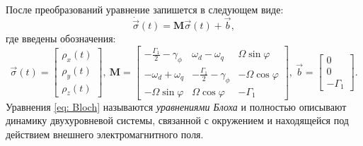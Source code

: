 После преобразований уравнение запишется в следующем виде:
\begin{equation}
\label{eq: Bloch}
\dot{\vec{\sigma}}{\left(t\right)} = \mathbf{M}\vec{\sigma}{\left(t\right)} + \vec{b}, 
\end{equation}
где введены обозначения:
\begin{equation}
\vec{\sigma}(t) = \left[\begin{matrix}\rho_x(t)\\\rho_y(t)\\\rho_z(t)\end{matrix}\right], \:	
\mathbf{M}=\left[\begin{matrix}- \frac{\Gamma_1}{2} - \gamma_{\phi} & \omega_d - \omega_q & \Omega \sin{\varphi}\\- \omega_d + \omega_q & - \frac{\Gamma_1}{2} - \gamma_{\phi} & - \Omega \cos{\varphi }\\- \Omega \sin{\varphi } & \Omega \cos{\varphi} & - \Gamma_1\end{matrix}\right], \:\vec{b} = \left[\begin{matrix}0\\0\\- \Gamma_1\end{matrix}\right].
\end{equation}
Уравнения \eqref{eq: Bloch} называются \textit{уравнениями Блоха} и полностью описывают динамику двухуровневой системы, связанной с окружением и находящейся под действием внешнего электромагнитного поля. 
